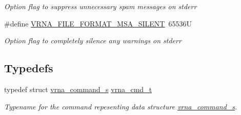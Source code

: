\begin{DoxyCompactItemize}
\begin{DoxyCompactList}\small\item\em Option flag to suppress unnecessary spam messages on {\ttfamily stderr} \end{DoxyCompactList}\item 
\#define \mbox{\hyperlink{group__file__utils_gad98ca08968d19f221f29d2a1faf26887}{V\+R\+N\+A\+\_\+\+F\+I\+L\+E\+\_\+\+F\+O\+R\+M\+A\+T\+\_\+\+M\+S\+A\+\_\+\+S\+I\+L\+E\+NT}}~65536U
\begin{DoxyCompactList}\small\item\em Option flag to completely silence any warnings on {\ttfamily stderr} \end{DoxyCompactList}\end{DoxyCompactItemize}
\subsection*{Typedefs}
\begin{DoxyCompactItemize}
\item 
typedef struct \mbox{\hyperlink{group__file__utils_structvrna__command__s}{vrna\+\_\+command\+\_\+s}} \mbox{\hyperlink{group__file__utils_ga92cb3b5952352b103bcb32e5a99e0e5a}{vrna\+\_\+cmd\+\_\+t}}
\begin{DoxyCompactList}\small\item\em Typename for the command repesenting data structure \mbox{\hyperlink{group__file__utils_structvrna__command__s}{vrna\+\_\+command\+\_\+s}}. \end{DoxyCompactList}\end{DoxyCompactItemize}
